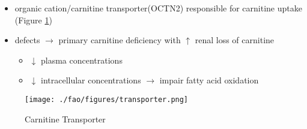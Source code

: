 \documentclass{scrartcl}
\begin{document}
\begin{enumerate}
\begin{enumerate}
\label{sec:orgbd4269b}
\begin{itemize}
\item organic cation/carnitine transporter(OCTN2) responsible for
carnitine uptake (Figure \ref{fig:orgcb0cd0c})
\item defects \(\to\) primary carnitine deficiency with \(\uparrow\) renal loss of carnitine
\begin{itemize}
\item \(\downarrow\) plasma concentrations
\item \(\downarrow\) intracellular concentrations \(\to\) impair fatty acid
oxidation
\end{itemize}
\end{itemize}

\begin{figure}[htbp]
\centering
\texttt{[image: ./fao/figures/transporter.png]}
\caption{\label{fig:orgcb0cd0c}
Carnitine Transporter}
\end{figure}


\end{enumerate}
\end{enumerate}
\end{document}
